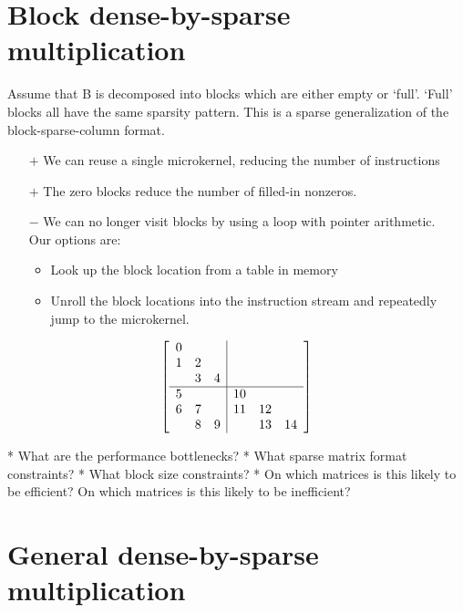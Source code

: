 {\section{Block dense-by-sparse multiplication}

  Assume that B is decomposed into blocks which are either empty or `full'. `Full' blocks all have the same sparsity pattern. This is a sparse generalization of the block-sparse-column format.

  \begin{itemize}
  \item[$+$] We can reuse a single microkernel, reducing the number of instructions
  \item[$+$] The zero blocks reduce the number of filled-in nonzeros.
  \item[$-$] We can no longer visit blocks by using a loop with pointer arithmetic. \\Our options are:
    \begin{itemize}
    \item Look up the block location from a table in memory
    \item Unroll the block locations into the instruction stream and repeatedly jump to the microkernel.
    \end{itemize}
  \end{itemize}

      \[
      \left[
          \begin{array}{c c c | c c c }
          0 &   &   &    &    &    \\
          1 & 2 &   &    &    &    \\
            & 3 & 4 &    &    &    \\
          \hline
          5 &   &   & 10 &    &    \\
          6 & 7 &   & 11 & 12 &    \\
            & 8 & 9 &    & 13 & 14 \\
          \end{array}
          \right]
      \]


* What are the performance bottlenecks?
* What sparse matrix format constraints?
* What block size constraints?
* On which matrices is this likely to be efficient? On which matrices is this likely to be inefficient?


\section{General dense-by-sparse multiplication}

}

